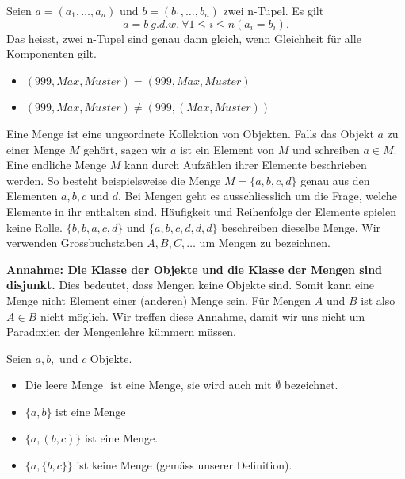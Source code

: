 \documentclass[../DatenbankenFS23.tex]{subfiles}
\begin{document}
\begin{defn}
    Seien $a = (a_1, \dots , a_n)$ und $b = (b_1, \dots , b_n)$ zwei n-Tupel. Es gilt
\[a = b\ g.d.w.\ \forall 1 \leq i \leq n(a_i = b_i).\]
Das heisst, zwei n-Tupel sind genau dann gleich, wenn Gleichheit f\"ur alle
Komponenten gilt.
\end{defn}

\begin{beispiel}
   \begin{itemize}
       \item $(999, Max, Muster) = (999, Max, Muster) $
       \item $(999, Max, Muster) \neq (999, (Max, Muster)) $
   \end{itemize}
\end{beispiel}

\begin{defn}[Mengen]
Eine Menge ist eine ungeordnete Kollektion von Objekten. Falls das
Objekt $a$ zu einer Menge $M$ geh\"ort, sagen wir $a$ ist ein Element von $M$
und schreiben $a \in M$. \newline
Eine endliche Menge $M$ kann durch Aufz\"ahlen ihrer Elemente beschrieben
werden. So besteht beispielsweise die Menge $M = \{a, b, c, d\}$ genau aus
den Elementen $a, b, c$ und $d$.\newline
Bei Mengen geht es ausschliesslich um die Frage, welche Elemente in ihr
enthalten sind. H\"aufigkeit und Reihenfolge der Elemente spielen keine Rolle.\newline
$\{b, b, a, c, d\}$ und $\{a, b, c, d, d, d\}$\newline
beschreiben dieselbe Menge.\newline
Wir verwenden Grossbuchstaben $A, B, C, \dots$ um Mengen zu bezeichnen.



\end{defn}
\begin{wichtig}
\textbf{Annahme: Die Klasse der Objekte und die Klasse der Mengen sind disjunkt.}
Dies bedeutet, dass Mengen keine Objekte sind. Somit kann eine Menge
nicht Element einer (anderen) Menge sein.
F\"ur Mengen $A$ und $B$ ist also $A \in B$ nicht m\"oglich.
Wir treffen diese Annahme,
damit wir uns nicht um
Paradoxien der Mengenlehre
k\"ummern m\"ussen.
\end{wichtig}
\begin{beispiel}
    Seien $a, b,$ und $c$ Objekte.
    \begin{itemize}
        \item Die leere Menge ${}$ ist eine Menge, sie wird auch mit $\emptyset$ bezeichnet.
        \item $\{a, b\}$ ist eine Menge
        \item $\{a,(b, c)\}$ ist eine Menge.
        \item $\{a, \{b, c\}\}$ ist keine Menge (gem\"ass unserer Definition).
    \end{itemize}
 \end{beispiel}
\end{document}
